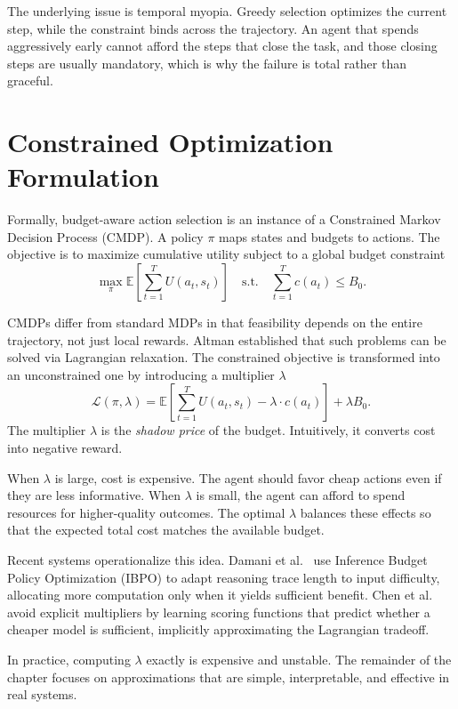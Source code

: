 The underlying issue is temporal myopia. Greedy selection optimizes the current step, while the constraint binds across the trajectory. An agent that spends aggressively early cannot afford the steps that close the task, and those closing steps are usually mandatory, which is why the failure is total rather than graceful.

\section{Constrained Optimization Formulation}

Formally, budget-aware action selection is an instance of a Constrained Markov Decision Process (CMDP). A policy $\pi$ maps states and budgets to actions. The objective is to maximize cumulative utility subject to a global budget constraint
\[
\max_\pi \mathbb{E}\left[\sum_{t=1}^{T} U(a_t, s_t)\right]
\quad \text{s.t.} \quad \sum_{t=1}^{T} c(a_t) \leq B_0.
\]

CMDPs differ from standard MDPs in that feasibility depends on the entire trajectory, not just local rewards. Altman \cite{altman1999constrained} established that such problems can be solved via Lagrangian relaxation. The constrained objective is transformed into an unconstrained one by introducing a multiplier $\lambda$
\[
\mathcal{L}(\pi, \lambda) =
\mathbb{E}\left[\sum_{t=1}^{T} U(a_t, s_t) - \lambda \cdot c(a_t)\right] + \lambda B_0.
\]
The multiplier $\lambda$ is the \emph{shadow price} of the budget. Intuitively, it converts cost into negative reward.

When $\lambda$ is large, cost is expensive. The agent should favor cheap actions even if they are less informative. When $\lambda$ is small, the agent can afford to spend resources for higher-quality outcomes. The optimal $\lambda$ balances these effects so that the expected total cost matches the available budget.

Recent systems operationalize this idea. Damani et al.\ \cite{damani2025ibpo} use Inference Budget Policy Optimization (IBPO) to adapt reasoning trace length to input difficulty, allocating more computation only when it yields sufficient benefit. Chen et al.\ \cite{chen2023frugalgpt} avoid explicit multipliers by learning scoring functions that predict whether a cheaper model is sufficient, implicitly approximating the Lagrangian tradeoff.

In practice, computing $\lambda$ exactly is expensive and unstable. The remainder of the chapter focuses on approximations that are simple, interpretable, and effective in real systems.
